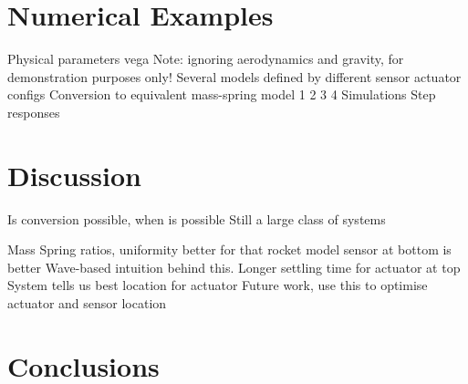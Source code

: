 \documentclass{mbd_fullpaper}
\begin{document}
\section{Numerical Examples}
Physical parameters vega
Note: ignoring aerodynamics and gravity, for demonstration purposes only!
Several models defined by different sensor actuator configs
Conversion to equivalent mass-spring model
1
2
3
4
Simulations
Step responses

\section{Discussion}
Is conversion possible, when is possible
Still a large class of systems

Mass Spring ratios, uniformity better
for that rocket model sensor at bottom is better
Wave-based intuition behind this. Longer settling time for actuator at top
System tells us best location for actuator
Future work, use this to optimise actuator and sensor location

\section{Conclusions}




\end{document}
